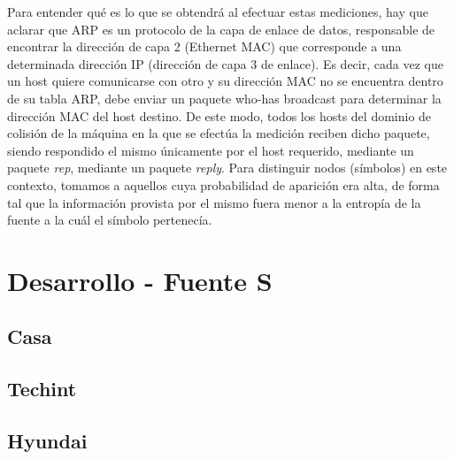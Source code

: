 \documentclass[final,narroweqnarray,inline]{ieee}
\begin{document}
\medskip
Para entender qué es lo que se obtendrá al efectuar estas mediciones, hay que aclarar que
ARP es un protocolo de la capa de enlace de datos, responsable de encontrar
la dirección de capa 2 (Ethernet MAC) que corresponde a una determinada
dirección IP (dirección de capa 3 de enlace). Es decir, cada vez que un host
quiere comunicarse con otro y su dirección MAC no se encuentra dentro de su
tabla ARP, debe enviar un paquete who-has broadcast para determinar la dirección MAC
del host destino. De este modo, todos los hosts del dominio de colisión de
la máquina en la que se efectúa la medición reciben dicho paquete, siendo respondido el mismo únicamente
por el host requerido, mediante un paquete \emph{rep}, mediante un paquete \emph{reply}.
Para distinguir nodos (símbolos) en este contexto, tomamos a aquellos cuya
probabilidad de aparición era alta, de forma tal que la información provista
por el mismo fuera menor a la entropía de la fuente a la cuál el símbolo pertenecía.

\newpage
\section{Desarrollo - Fuente S}
  \subsection{Casa}

  \subsection{Techint}

  \subsection{Hyundai}

\end{document}

